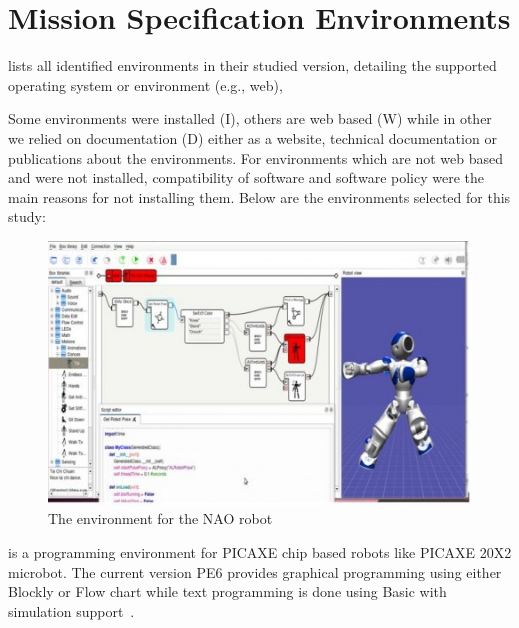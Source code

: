 \section{Mission Specification Environments}\label{sec:environments}

 lists all identified environments in their studied version, detailing the supported operating system or environment (e.g., web), 

Some environments were installed (I), others are web based (W) while in other we relied on documentation (D) either as a website, technical documentation or publications about the environments. For environments which are not web based and were not installed, compatibility of software and software policy were  the main reasons for not installing them. Below are the environments selected for this study:



\begin{figure}[t]
     \centering
    \includegraphics[width=\columnwidth]{choregraphe.png}
      \caption{The environment \choregraphe for the NAO robot}
      \label{fig:choregraphe}
   \end{figure}


\parhead{\picaxe} is a programming environment for PICAXE chip based robots like PICAXE 20X2 microbot. The current version PE6 provides graphical programming using either Blockly or Flow chart while text programming is done using Basic with simulation support~\cite{PICAXE}.%


